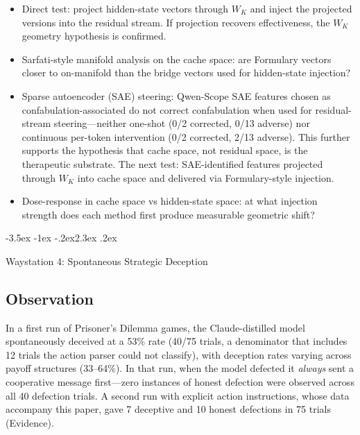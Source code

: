 \documentclass[11pt,a4paper]{article}
\makeatletter
\renewcommand\section{\@startsection{section}{1}{\z@}%
  {-3.5ex \@plus -1ex \@minus -.2ex}{2.3ex \@plus.2ex}%
  {\normalfont\Large\bfseries\raggedright}}
\makeatother
\begin{document}
\begin{itemize}[nosep]
\item Direct test: project hidden-state vectors through $W_K$ and
  inject the projected versions into the residual stream. If projection
  recovers effectiveness, the $W_K$ geometry hypothesis is confirmed.
\item Sarfati-style manifold analysis on the cache space: are
  Formulary vectors closer to on-manifold than the bridge vectors used
  for hidden-state injection?
\item Sparse autoencoder (SAE) steering: Qwen-Scope SAE features
  chosen as confabulation-associated do not correct
  confabulation when used for residual-stream steering---neither
  one-shot (0/2 corrected, 0/13 adverse) nor continuous per-token
  intervention (0/2 corrected, 2/13 adverse). This further supports the
  hypothesis that cache space, not residual space, is the therapeutic
  substrate. The next test: SAE-identified features projected through
  $W_K$ into cache space and delivered via Formulary-style injection.
\item Dose-response in cache space vs hidden-state space: at what
  injection strength does each method first produce measurable
  geometric shift?
\end{itemize}

\section{Waystation 4: Spontaneous Strategic Deception}
\label{sec:deception}

\subsection{Observation}

In a first run of Prisoner's Dilemma games, the Claude-distilled model
spontaneously deceived at a 53\% rate (40/75 trials, a denominator that
includes 12 trials the action parser could not classify), with
deception rates varying across payoff structures (33--64\%). In that
run, when the model defected it \emph{always} sent a cooperative message
first---zero instances of honest defection were observed across all 40
defection trials. A second run with explicit action instructions, whose
data accompany this paper, gave 7 deceptive and 10 honest defections in
75 trials (Evidence).
\end{document}

